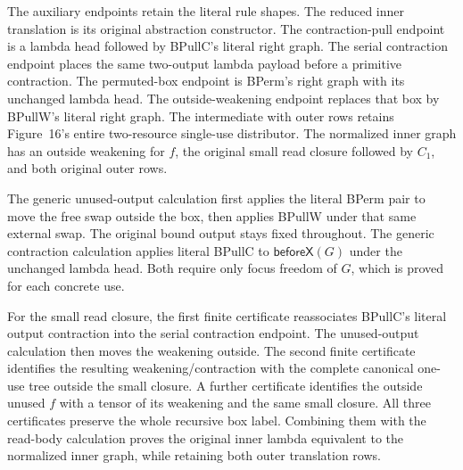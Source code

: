 The auxiliary endpoints retain the literal rule shapes. The reduced inner
translation is its original abstraction constructor. The contraction-pull
endpoint is a lambda head followed by BPullC's literal right graph.
The serial contraction endpoint places the same two-output lambda payload
before a primitive contraction. The permuted-box endpoint is BPerm's
right graph with its unchanged lambda head. The outside-weakening endpoint
replaces that box by BPullW's literal right graph. The intermediate with
outer rows retains Figure~16's entire two-resource single-use distributor.
The normalized inner graph has an outside weakening for $f$, the original
small read closure followed by $C_1$, and both original outer rows.

The generic unused-output calculation first applies the literal BPerm pair
to move the free swap outside the box, then applies BPullW under that same
external swap. The original bound output stays fixed throughout. The
generic contraction calculation applies literal BPullC to
$\mathsf{beforeX}(G)$ under the unchanged lambda head. Both require only
focus freedom of $G$, which is proved for each concrete use.

For the small read closure, the first finite certificate reassociates
BPullC's literal output contraction into the serial contraction endpoint.
The unused-output calculation then moves the weakening outside. The second
finite certificate identifies the resulting weakening/contraction with the
complete canonical one-use tree outside the small closure. A further
certificate identifies the outside unused $f$ with a tensor of its weakening
and the same small closure. All three certificates preserve the whole
recursive box label. Combining them with the read-body calculation proves
the original inner lambda equivalent to the normalized inner graph, while
retaining both outer translation rows.

